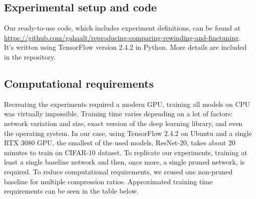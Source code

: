 \subsection{Experimental setup and code}


Our ready-to-use code, which includes experiment definitions, can be found at 
\url{https://github.com/gahaalt/reproducing-comparing-rewinding-and-finetuning}.
It's written using TensorFlow \cite{tensorflow} version 2.4.2 in Python. More details are included in the repository.

\subsection{Computational requirements}

Recreating the experiments required a modern GPU, training all models on CPU was virtually impossible. Training time varies depending on a lot of factors: network variation and size, exact version of the deep learning library, and even the operating system. In our case, using TensorFlow 2.4.2 on Ubuntu and a single RTX 3080 GPU, the smallest of the used models, ResNet-20, takes about 20 minutes to train on CIFAR-10 dataset. To replicate our experiments, training at least a single baseline network and then, once more, a single pruned network, is required. To reduce computational requirements, we reused one non-pruned baseline for multiple compression ratios. Approximated training time requirements can be seen in the table below.

